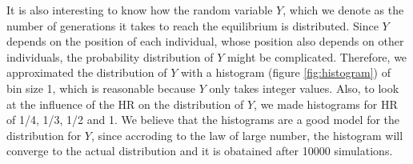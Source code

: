 It is also interesting to know how the random variable $Y$, which we denote as the number of generations it takes to reach the equilibrium is distributed. Since $Y$ depends on the position of each individual, whose position also depends on other individuals, the probability distribution of $Y$ might be complicated. Therefore, we approximated the distribution of $Y$ with a histogram (figure \ref{fig:histogram}) of bin size 1, which is reasonable because $Y$ only takes integer values. Also, to look at the influence of the HR on the distribution of $Y$, we made histograms for HR of 1/4, 1/3, 1/2 and 1.  We believe that the histograms are a good model for the distribution for $Y$, since accroding to the law of large number, the histogram will converge to the actual distribution and it is obatained after 10000 simulations.\\
\\
 
